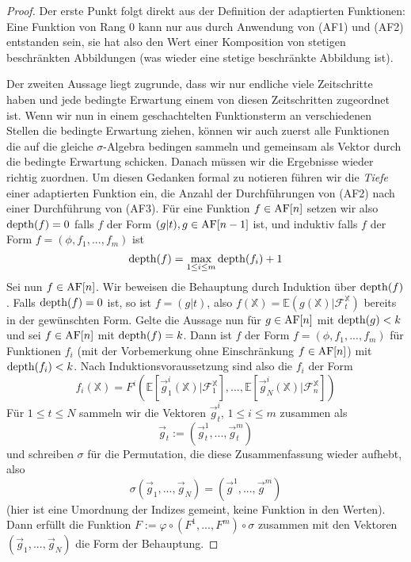 \begin{proof}
Der erste Punkt folgt direkt aus der Definition der adaptierten Funktionen: Eine Funktion von Rang 0 kann nur aus durch Anwendung von (AF1) und (AF2) entstanden sein, sie hat also den Wert einer Komposition von stetigen beschränkten Abbildungen (was wieder eine stetige beschränkte Abbildung ist). 

Der zweiten Aussage liegt zugrunde, dass wir nur endliche viele Zeitschritte haben und jede bedingte Erwartung einem von diesen Zeitschritten zugeordnet ist. Wenn wir nun in einem geschachtelten Funktionsterm an verschiedenen Stellen die bedingte Erwartung ziehen, können wir auch zuerst alle Funktionen die auf die gleiche $\sigma$-Algebra bedingen sammeln und gemeinsam als Vektor durch die bedingte Erwartung schicken. Danach müssen wir die Ergebnisse wieder richtig zuordnen. Um diesen Gedanken formal zu notieren führen wir die \emph{Tiefe} einer adaptierten Funktion ein, die Anzahl der Durchführungen von (AF2) nach einer Durchführung von (AF3). Für eine Funktion $f \in \operatorname{AF}[n]$ setzen wir also $\operatorname{depth}(f)=0$ falls $f$ der Form $(g \vert t), g \in \operatorname{AF}[n-1]$ ist, und induktiv falls $f$ der Form $f=(\phi, f_1,...,f_m)$ ist
$$\operatorname{depth}(f) = \max_{1\leq i \leq m} \operatorname{depth}(f_i) + 1$$
Sei nun $f \in \operatorname{AF}[n]$. Wir beweisen die Behauptung durch Induktion über $\operatorname{depth}(f)$. Falls $\operatorname{depth}(f)=0$ ist, so ist $f = (g \vert t)$, also $f(\mathbb{X}) = \mathbb{E}(g(\mathbb{X})\vert \mathcal{F}_t^\mathbb{X})$ bereits in der gewünschten Form. Gelte die Aussage nun für $g \in \operatorname{AF}[n]$ mit $\operatorname{depth}(g) < k$ und sei $f\in\operatorname{AF}[n]$ mit $\operatorname{depth}(f)=k$. Dann ist $f$ der Form $f=(\phi, f_1,...,f_m)$ für Funktionen $f_i$ (mit der Vorbemerkung ohne Einschränkung $f \in \operatorname{AF}[n]$) mit $\operatorname{depth}(f_i)<k$. Nach Induktionsvoraussetzung sind also die $f_i$ der Form
$$f_i(\mathbb{X}) = F^i(\mathbb{E}[\vec{g}_1^i(\mathbb{X}) \vert \mathcal{F}_1^\mathbb{X}],...,\mathbb{E}[\vec{g}_N^i(\mathbb{X}) \vert \mathcal{F}_n^\mathbb{X}])$$
Für $1\leq t \leq N$ sammeln wir die Vektoren $\vec{g}_t^i$, $1 \leq i \leq m$ zusammen als
$$\vec{g}_t:=(\vec{g}_t^1,...,\vec{g}_t^m)$$
und schreiben $\sigma$ für die Permutation, die diese Zusammenfassung wieder aufhebt, also
$$\sigma(\vec{g}_1,...,\vec{g}_N) = (\vec{g}^1,...,\vec{g}^m)$$
(hier ist eine Umordnung der Indizes gemeint, keine Funktion in den Werten). Dann erfüllt die Funktion $F := \varphi \circ (F^1,...,F^m) \circ \sigma$ zusammen mit den Vektoren $(\vec{g}_1,...,\vec{g}_N)$ die Form der Behauptung.
\end{proof}

